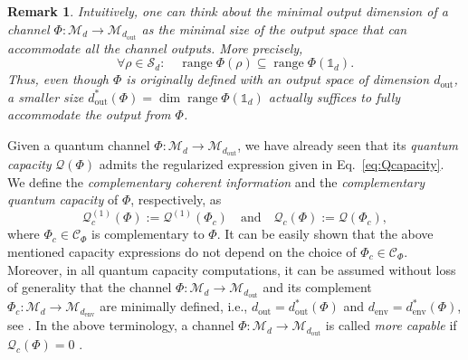 \documentclass[a4paper,onecolumn,10pt,accepted=2022-07-11]{quantumarticle}
\newcommand{\M}[1]{\mathcal{M}_{#1}}
\newcommand{\St}[1]{\mathcal{S}_{#1}}
\newcommand{\env}{\operatorname{env}}
\newcommand{\out}{\operatorname{out}}
\newtheorem{remark}[theorem]{Remark}
\theoremstyle{definition}
\newcommand{\iden}{\mathbb{1}}
\begin{document}
\begin{remark}\cite[Remark II.2]{Singh2022detecting}
Intuitively, one can think about the minimal output dimension of a channel $\Phi:\M{d}\to \M{d_{\out}}$ as the minimal size of the output space that can accommodate all the channel outputs. More precisely,
\begin{equation}
    \forall \rho\in\St{d}: \quad \operatorname{range}\Phi(\rho) \subseteq \operatorname{range}\Phi(\iden_d).
\end{equation}
Thus, even though $\Phi$ is originally defined with an output space of dimension $d_{\out}$, a smaller size $d^*_{\out}(\Phi)=\dim \operatorname{range}\Phi(\iden_d)$ actually suffices to fully accommodate the output from $\Phi$. 
\end{remark}

Given a quantum channel $\Phi:\M{d}\to \M{d_{\out}}$, we have already seen that its \emph{quantum capacity} $\mathcal{Q}(\Phi)$ admits the regularized expression given in Eq.~\eqref{eq:Qcapacity}. We define the \emph{complementary coherent information} and the \emph{complementary quantum capacity} of $\Phi$, respectively, as
\begin{equation}
    \mathcal{Q}^{(1)}_c(\Phi) := \mathcal{Q}^{(1)}(\Phi_c) \quad\text{and}\quad
    \mathcal{Q}_c(\Phi) := \mathcal{Q}(\Phi_c),
\end{equation}
where $\Phi_c\in\mathcal{C}_{\Phi}$ is complementary to $\Phi$. It can be easily shown that the above mentioned capacity expressions do not depend on the choice of $\Phi_c\in\mathcal{C}_{\Phi}$. Moreover, in all quantum capacity computations, it can be assumed without loss of generality that the channel $\Phi:\M{d}\to \M{d_{\out}}$ and its complement $\Phi_c:\M{d}\to \M{d_{\env}}$ are minimally defined, i.e., $d_{\out}=d^*_{\out}(\Phi)$ and $d_{\env}=d^*_{\env}(\Phi)$, see \cite[Remark II.5]{Singh2022detecting}. In the above terminology, a channel $\Phi:\M{d}\to \M{d_{\out}}$ is called \emph{more capable} if $\mathcal{Q}_c(\Phi)=0$ \cite{Watanabe2012capable}.
\end{document}
